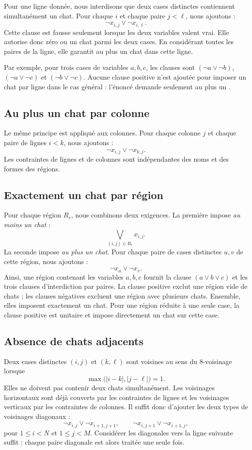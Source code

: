 \documentclass[11pt,a4paper]{article}
\begin{document}
Pour une ligne donnée, nous interdisons que deux cases distinctes contiennent
simultanément un chat. Pour chaque $i$ et chaque paire $j<\ell$, nous ajoutons :
\[
  \neg x_{i,j}\lor\neg x_{i,\ell}.
\]
Cette clause est fausse seulement lorsque les deux variables valent vrai.
Elle autorise donc zéro ou un chat parmi les deux cases. En considérant
toutes les paires de la ligne, elle garantit au plus un chat dans cette ligne.

Par exemple, pour trois cases de variables $a,b,c$, les clauses sont
$(\neg a\lor\neg b)$, $(\neg a\lor\neg c)$ et
$(\neg b\lor\neg c)$. Aucune clause positive n'est ajoutée pour imposer
un chat par ligne dans le cas général : l'énoncé demande seulement
\og au plus un \fg{}.

\subsection{Au plus un chat par colonne}

Le même principe est appliqué aux colonnes. Pour chaque colonne $j$ et
chaque paire de lignes $i<k$, nous ajoutons :
\[
  \neg x_{i,j}\lor\neg x_{k,j}.
\]
Les contraintes de lignes et de colonnes sont indépendantes des noms
et des formes des régions.

\subsection{Exactement un chat par région}

Pour chaque région $R_r$, nous combinons deux exigences. La première impose
\emph{au moins un chat} :
\[
  \bigvee_{(i,j)\in R_r}x_{i,j}.
\]
La seconde impose \emph{au plus un chat}. Pour chaque paire de cases
distinctes $u,v$ de cette région, nous ajoutons :
\[
  \neg x_u\lor\neg x_v.
\]
Ainsi, une région contenant les variables $a,b,c$ fournit la clause
$(a\lor b\lor c)$ et les trois clauses d'interdiction par paires.
La clause positive exclut une région vide de chats ; les clauses négatives
excluent une région avec plusieurs chats. Ensemble, elles imposent
exactement un chat. Pour une région réduite à une seule case, la clause
positive est unitaire et impose directement un chat sur cette case.

\subsection{Absence de chats adjacents}

Deux cases distinctes $(i,j)$ et $(k,\ell)$ sont voisines au sens du
8-voisinage lorsque
\[
  \max\bigl(|i-k|,|j-\ell|\bigr)=1.
\]
Elles ne doivent pas contenir deux chats simultanément. Les voisinages
horizontaux sont déjà couverts par les contraintes de lignes et les
voisinages verticaux par les contraintes de colonnes. Il suffit donc
d'ajouter les deux types de voisinages diagonaux :
\[
  \neg x_{i,j}\lor\neg x_{i+1,j+1},\qquad
  \neg x_{i,j+1}\lor\neg x_{i+1,j},
\]
pour $1\leq i<N$ et $1\leq j<M$. Considérer les diagonales vers la ligne
suivante suffit : chaque paire diagonale est alors traitée une seule fois.
\end{document}
